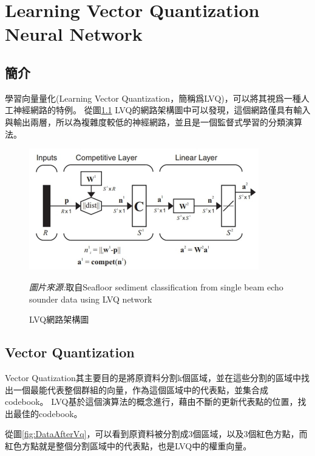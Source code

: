 \chapter{Learning Vector Quantization Neural Network}
\label{chapter:lvq}
\section{簡介}


學習向量量化(Learning Vector Quantization，簡稱爲LVQ)，可以將其視爲一種人工神經網路的特例。
從圖\ref{fig:LvqNetwork} LVQ的網路架構圖中可以發現，這個網路僅具有輸入與輸出兩層，所以為複雜度較低的神經網路，並且是一個監督式學習的分類演算法。

\begin{figure}[h]
	\centering
	\includegraphics[width=10cm]{pic/lvq_architecture.jpg}
	\caption{LVQ網路架構圖}
	\begin{minipage}{.7\linewidth}
		\footnotesize
		\emph{圖片來源:}取自Seafloor sediment classification from single beam echo sounder data using LVQ network
	\end{minipage}
	\label{fig:LvqNetwork}
\end{figure}
\label{sec:background}


\section{Vector Quantization}
Vector Quatization其主要目的是將原資料分割k個區域，並在這些分割的區域中找出一個最能代表整個群組的向量，作為這個區域中的代表點，並集合成codebook。
LVQ基於這個演算法的概念進行，藉由不斷的更新代表點的位置，找出最佳的codebook。


從圖\ref{fig:DataAfterVq}，可以看到原資料被分割成3個區域，以及3個紅色方點，而紅色方點就是整個分割區域中的代表點，也是LVQ中的權重向量。


